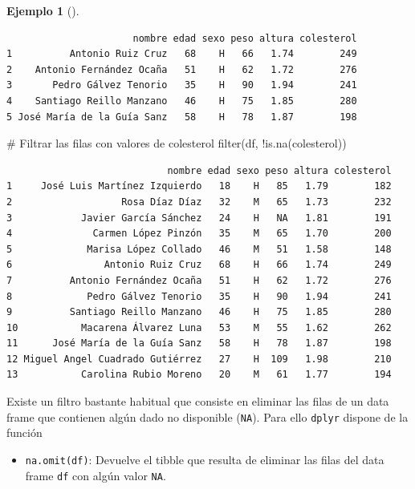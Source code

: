 \documentclass[
  spanish,
  a4paper,
]{scrreport}
\newenvironment{Shaded}{\begin{snugshade}}{\end{snugshade}}
\newcommand{\CommentTok}[1]{\textcolor[rgb]{0.37,0.37,0.37}{#1}}
\newcommand{\FunctionTok}[1]{\textcolor[rgb]{0.28,0.35,0.67}{#1}}
\newcommand{\NormalTok}[1]{\textcolor[rgb]{0.00,0.23,0.31}{#1}}
\newcommand{\SpecialCharTok}[1]{\textcolor[rgb]{0.37,0.37,0.37}{#1}}
\providecommand{\tightlist}{%
  \setlength{\itemsep}{0pt}\setlength{\parskip}{0pt}}
\theoremstyle{definition}
\theoremstyle{definition}
\newtheorem{example}{Ejemplo}[chapter]
\theoremstyle{remark}
\begin{document}
\begin{example}[]
\begin{verbatim}
                      nombre edad sexo peso altura colesterol
1          Antonio Ruiz Cruz   68    H   66   1.74        249
2    Antonio Fernández Ocaña   51    H   62   1.72        276
3       Pedro Gálvez Tenorio   35    H   90   1.94        241
4    Santiago Reillo Manzano   46    H   75   1.85        280
5 José María de la Guía Sanz   58    H   78   1.87        198
\end{verbatim}

\begin{Shaded}
\begin{Highlighting}[]
\CommentTok{\# Filtrar las filas con valores de colesterol}
\FunctionTok{filter}\NormalTok{(df, }\SpecialCharTok{!}\FunctionTok{is.na}\NormalTok{(colesterol))}
\end{Highlighting}
\end{Shaded}

\begin{verbatim}
                            nombre edad sexo peso altura colesterol
1     José Luis Martínez Izquierdo   18    H   85   1.79        182
2                   Rosa Díaz Díaz   32    M   65   1.73        232
3            Javier García Sánchez   24    H   NA   1.81        191
4              Carmen López Pinzón   35    M   65   1.70        200
5             Marisa López Collado   46    M   51   1.58        148
6                Antonio Ruiz Cruz   68    H   66   1.74        249
7          Antonio Fernández Ocaña   51    H   62   1.72        276
8             Pedro Gálvez Tenorio   35    H   90   1.94        241
9          Santiago Reillo Manzano   46    H   75   1.85        280
10           Macarena Álvarez Luna   53    M   55   1.62        262
11      José María de la Guía Sanz   58    H   78   1.87        198
12 Miguel Angel Cuadrado Gutiérrez   27    H  109   1.98        210
13           Carolina Rubio Moreno   20    M   61   1.77        194
\end{verbatim}

\end{example}

Existe un filtro bastante habitual que consiste en eliminar las filas de
un data frame que contienen algún dado no disponible (\texttt{NA}). Para
ello \texttt{dplyr} dispone de la función

\begin{itemize}
\tightlist
\item
  \texttt{na.omit(df)}: Devuelve el tibble que resulta de eliminar las
  filas del data frame \texttt{df} con algún valor \texttt{NA}.
\end{itemize}
\end{document}
